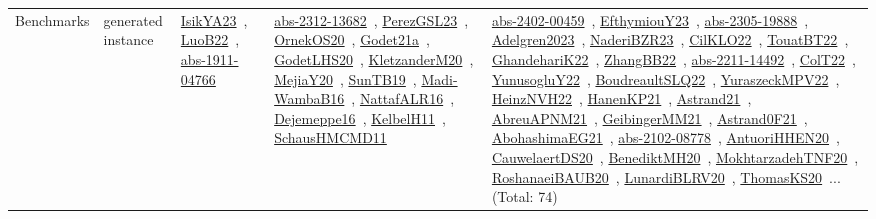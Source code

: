 {\begin{longtable}{lp{3cm}>{\raggedright\arraybackslash}p{6cm}>{\raggedright\arraybackslash}p{6cm}>{\raggedright\arraybackslash}p{8cm}}
\index{generated instance}\index{Benchmarks!generated instance}Benchmarks & generated instance & \href{../works/IsikYA23.pdf}{IsikYA23}~\cite{IsikYA23}, \href{../works/LuoB22.pdf}{LuoB22}~\cite{LuoB22}, \href{../works/abs-1911-04766.pdf}{abs-1911-04766}~\cite{abs-1911-04766} & \href{../works/abs-2312-13682.pdf}{abs-2312-13682}~\cite{abs-2312-13682}, \href{../works/PerezGSL23.pdf}{PerezGSL23}~\cite{PerezGSL23}, \href{../works/OrnekOS20.pdf}{OrnekOS20}~\cite{OrnekOS20}, \href{../works/Godet21a.pdf}{Godet21a}~\cite{Godet21a}, \href{../works/GodetLHS20.pdf}{GodetLHS20}~\cite{GodetLHS20}, \href{../works/KletzanderM20.pdf}{KletzanderM20}~\cite{KletzanderM20}, \href{../works/MejiaY20.pdf}{MejiaY20}~\cite{MejiaY20}, \href{../works/SunTB19.pdf}{SunTB19}~\cite{SunTB19}, \href{../works/Madi-WambaB16.pdf}{Madi-WambaB16}~\cite{Madi-WambaB16}, \href{../works/NattafALR16.pdf}{NattafALR16}~\cite{NattafALR16}, \href{../works/Dejemeppe16.pdf}{Dejemeppe16}~\cite{Dejemeppe16}, \href{../works/KelbelH11.pdf}{KelbelH11}~\cite{KelbelH11}, \href{../works/SchausHMCMD11.pdf}{SchausHMCMD11}~\cite{SchausHMCMD11} & \href{../works/abs-2402-00459.pdf}{abs-2402-00459}~\cite{abs-2402-00459}, \href{../works/EfthymiouY23.pdf}{EfthymiouY23}~\cite{EfthymiouY23}, \href{../works/abs-2305-19888.pdf}{abs-2305-19888}~\cite{abs-2305-19888}, \href{../works/Adelgren2023.pdf}{Adelgren2023}~\cite{Adelgren2023}, \href{../works/NaderiBZR23.pdf}{NaderiBZR23}~\cite{NaderiBZR23}, \href{../works/CilKLO22.pdf}{CilKLO22}~\cite{CilKLO22}, \href{../works/TouatBT22.pdf}{TouatBT22}~\cite{TouatBT22}, \href{../works/GhandehariK22.pdf}{GhandehariK22}~\cite{GhandehariK22}, \href{../works/ZhangBB22.pdf}{ZhangBB22}~\cite{ZhangBB22}, \href{../works/abs-2211-14492.pdf}{abs-2211-14492}~\cite{abs-2211-14492}, \href{../works/ColT22.pdf}{ColT22}~\cite{ColT22}, \href{../works/YunusogluY22.pdf}{YunusogluY22}~\cite{YunusogluY22}, \href{../works/BoudreaultSLQ22.pdf}{BoudreaultSLQ22}~\cite{BoudreaultSLQ22}, \href{../works/YuraszeckMPV22.pdf}{YuraszeckMPV22}~\cite{YuraszeckMPV22}, \href{../works/HeinzNVH22.pdf}{HeinzNVH22}~\cite{HeinzNVH22}, \href{../works/HanenKP21.pdf}{HanenKP21}~\cite{HanenKP21}, \href{../works/Astrand21.pdf}{Astrand21}~\cite{Astrand21}, \href{../works/AbreuAPNM21.pdf}{AbreuAPNM21}~\cite{AbreuAPNM21}, \href{../works/GeibingerMM21.pdf}{GeibingerMM21}~\cite{GeibingerMM21}, \href{../works/Astrand0F21.pdf}{Astrand0F21}~\cite{Astrand0F21}, \href{../works/AbohashimaEG21.pdf}{AbohashimaEG21}~\cite{AbohashimaEG21}, \href{../works/abs-2102-08778.pdf}{abs-2102-08778}~\cite{abs-2102-08778}, \href{../works/AntuoriHHEN20.pdf}{AntuoriHHEN20}~\cite{AntuoriHHEN20}, \href{../works/CauwelaertDS20.pdf}{CauwelaertDS20}~\cite{CauwelaertDS20}, \href{../works/BenediktMH20.pdf}{BenediktMH20}~\cite{BenediktMH20}, \href{../works/MokhtarzadehTNF20.pdf}{MokhtarzadehTNF20}~\cite{MokhtarzadehTNF20}, \href{../works/RoshanaeiBAUB20.pdf}{RoshanaeiBAUB20}~\cite{RoshanaeiBAUB20}, \href{../works/LunardiBLRV20.pdf}{LunardiBLRV20}~\cite{LunardiBLRV20}, \href{../works/ThomasKS20.pdf}{ThomasKS20}~\cite{ThomasKS20}... (Total: 74)\\

\end{longtable}}
